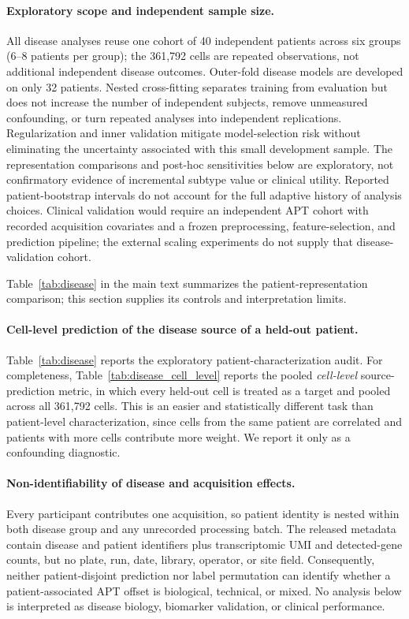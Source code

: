 \documentclass{article} %
\begin{document}


\paragraph{Exploratory scope and independent sample size.}
All disease analyses reuse one cohort of 40 independent patients across six
groups (6--8 patients per group); the 361{,}792 cells are repeated observations,
not additional independent disease outcomes. Outer-fold disease models are
developed on only 32 patients. Nested cross-fitting separates training from
evaluation but does not increase the number of independent subjects, remove
unmeasured confounding, or turn repeated analyses into independent replications.
Regularization and inner validation mitigate model-selection risk without
eliminating the uncertainty associated with this small development sample.
The representation comparisons and post-hoc sensitivities below are exploratory,
not confirmatory evidence of incremental subtype value or clinical utility.
Reported patient-bootstrap intervals do not account for the full adaptive
history of analysis choices. Clinical validation would require an independent
APT cohort with recorded acquisition covariates and a frozen preprocessing,
feature-selection, and prediction pipeline; the external scaling experiments
do not supply that disease-validation cohort.

Table~\ref{tab:disease} in the main text summarizes the patient-representation
comparison; this section supplies its controls and interpretation limits.

\paragraph{Cell-level prediction of the disease source of a held-out patient.}
Table~\ref{tab:disease} reports the exploratory patient-characterization
audit. For completeness, Table~\ref{tab:disease_cell_level} reports the pooled
\emph{cell-level} source-prediction metric, in which every held-out cell is
treated as a target and pooled across all 361{,}792 cells. This is an easier and
statistically different task than patient-level characterization, since cells
from the same patient are correlated and patients with more cells contribute
more weight. We report it only as a confounding diagnostic.

\paragraph{Non-identifiability of disease and acquisition effects.}
Every participant contributes one acquisition, so patient identity is nested
within both disease group and any unrecorded processing batch. The released
metadata contain disease and patient identifiers plus transcriptomic UMI and
detected-gene counts, but no plate, run, date, library, operator, or site field.
Consequently, neither patient-disjoint prediction nor label permutation can
identify whether a patient-associated APT offset is biological, technical, or
mixed. No analysis below is interpreted as disease biology, biomarker
validation, or clinical performance.
\end{document}
